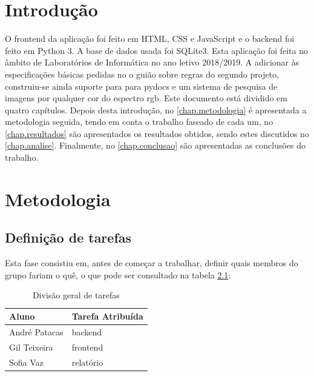 \documentclass{report}
\begin{document}
\tableofcontents
 \listoftables     %
 \listoffigures    %


\clearpage
{}

\chapter{Introdução}
\label{chap.introducao}

O frontend da aplicação foi feito em \ac{HTML}, \ac{CSS} e JavaScript e o backend foi feito em Python 3. A base de dados usada foi SQLite3. Esta aplicação foi feita no âmbito de Laboratórios de Informática no ano letivo 2018/2019.
A adicionar às especificações básicas pedidas no o guião sobre regras do segundo projeto, construiu-se ainda suporte para para pydocs e um sistema de pesquisa de imagens por qualquer cor do espectro rgb.
Este documento está dividido em quatro capítulos.
Depois desta introdução,
no \autoref{chap.metodologia} é apresentada a metodologia seguida, tendo em conta o trabalho faseado de cada um, 
no \autoref{chap.resultados} são apresentados os resultados obtidos,
sendo estes discutidos no \autoref{chap.analise}.
Finalmente, no \autoref{chap.conclusao} são apresentadas
as conclusões do trabalho.

\chapter{Metodologia}
\label{chap.metodologia}
\section{Definição de tarefas}
Esta fase consistiu em, antes de começar a trabalhar, definir quais membros do grupo fariam o quê, o que pode ser consultado na tabela \ref{tab:table1}: 
\begin{table}[h!]
\begin{center}
\caption{Divisão geral de tarefas}
\begin{tabular}{l|l}
\hline
\multicolumn{1}{|l|}{Aluno} & \multicolumn{1}{l|}{Tarefa Atribuída} \\ \hline
            André Patacas   & backend                               \\ 
            Gil Teixeira      & frontend                               \\
            Sofia Vaz         & relatório                                
\end{tabular}
\label{tab:table1}
\end{center}
\end{table}
\end{document}
